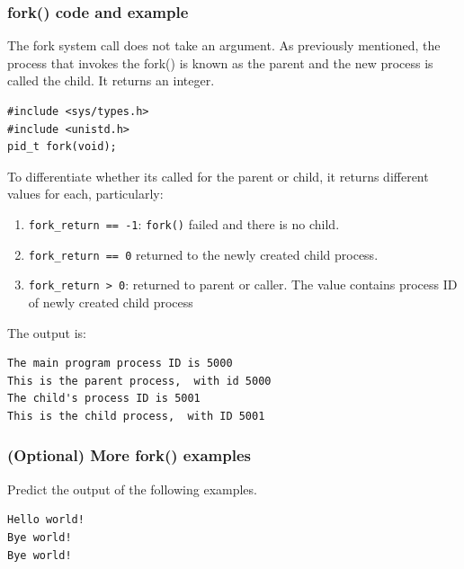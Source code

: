 \documentclass[a4paper]{article}
\begin{document}
\subsubsection{fork() code and example}
The fork system call does not take an argument. As previously mentioned, the process that invokes the fork() is known as the parent and the new process is called the child. It returns an integer.
\begin{verbatim}
#include <sys/types.h>
#include <unistd.h>
pid_t fork(void);
\end{verbatim}
To differentiate whether its called for the parent or child, it returns different values for each, particularly:
\begin{enumerate}
    \item \texttt{fork\_return == -1}: \texttt{fork()} failed and there is no child.
    \item \texttt{fork\_return == 0} returned to the newly created child process.
    \item \texttt{fork\_return > 0}: returned to parent or caller. The value contains process ID of newly created child process
\end{enumerate}

The output is:
\begin{verbatim}
The main program process ID is 5000
This is the parent process,  with id 5000
The child's process ID is 5001
This is the child process,  with ID 5001
\end{verbatim}

\subsubsection{(Optional) More fork() examples}

Predict the output of the following examples.
\begin{exmp}
\textup{

}
\end{exmp}
\begin{verbatim}
Hello world!
Bye world!
Bye world!
\end{verbatim}
\end{document}
